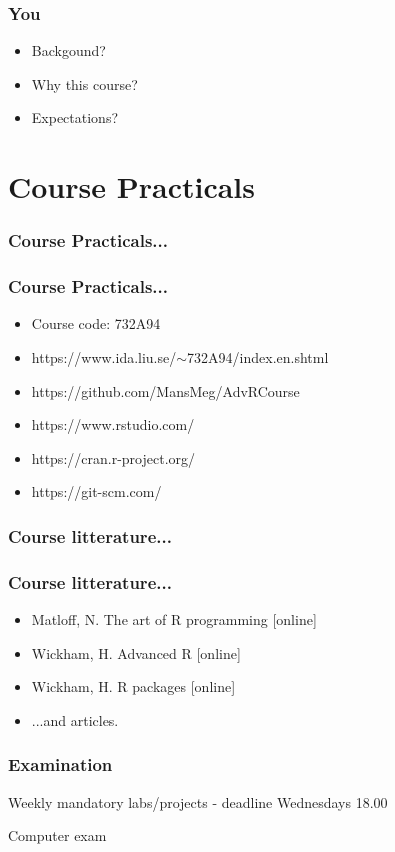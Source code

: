 \documentclass{beamer}
\begin{document}
\begin{frame}
	\frametitle{You}
	\begin{itemize}
		\item Backgound?
		\item Why this course?
		\item Expectations?
	\end{itemize}
\end{frame}

\section{Course Practicals}

\begin{frame}
	\frametitle{Course Practicals...}
\end{frame}

\begin{frame}
	\frametitle{Course Practicals...}
	\begin{itemize}
		\item Course code: 732A94
		\item https://www.ida.liu.se/$\sim$732A94/index.en.shtml
		\item https://github.com/MansMeg/AdvRCourse
		\item https://www.rstudio.com/
		\item https://cran.r-project.org/
		\item https://git-scm.com/
	\end{itemize}
\end{frame}


\begin{frame}
	\frametitle{Course litterature...}
\end{frame}

\begin{frame}
	\frametitle{Course litterature...}
	\begin{itemize}
		\item Matloff, N. The art of R programming [online]
		\item Wickham, H. Advanced R [online]
		\item  Wickham, H. R packages [online]
		\item ...and articles.
	\end{itemize}
\end{frame}


\begin{frame}
	\frametitle{Examination}
	Weekly mandatory labs/projects - deadline Wednesdays 18.00
	
	Computer exam
\end{frame}
\end{document}

